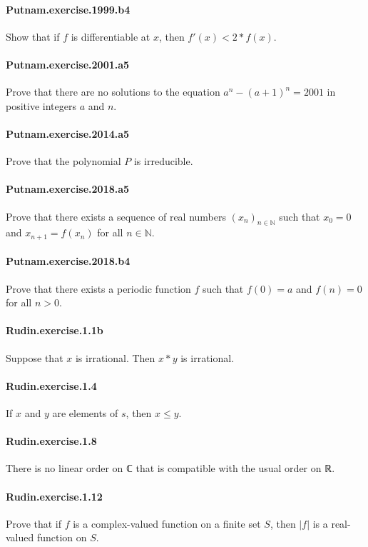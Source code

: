 \documentclass{article}
\begin{document}
{\paragraph{Putnam.exercise.1999.b4} Show that if $f$ is differentiable at $x$, then $f'(x) < 2 * f(x)$.

\paragraph{Putnam.exercise.2001.a5} Prove that there are no solutions to the equation $a^n - (a+1)^n = 2001$ in positive integers $a$ and $n$.

\paragraph{Putnam.exercise.2014.a5} Prove that the polynomial $P$ is irreducible.

\paragraph{Putnam.exercise.2018.a5} Prove that there exists a sequence of real numbers $(x_n)_{n\in\mathbb{N}}$ such that $x_0 = 0$ and $x_{n+1} = f(x_n)$ for all $n\in\mathbb{N}$.

\paragraph{Putnam.exercise.2018.b4} Prove that there exists a periodic function $f$ such that $f(0) = a$ and $f(n) = 0$ for all $n > 0$.

\paragraph{Rudin.exercise.1.1b} Suppose that $x$ is irrational. Then $x * y$ is irrational.

\paragraph{Rudin.exercise.1.4} If $x$ and $y$ are elements of $s$, then $x ≤ y$.

\paragraph{Rudin.exercise.1.8} There is no linear order on ℂ that is compatible with the usual order on ℝ.

\paragraph{Rudin.exercise.1.12} Prove that if $f$ is a complex-valued function on a finite set $S$, then $|f|$ is a real-valued function on $S$.

}
\end{document}
